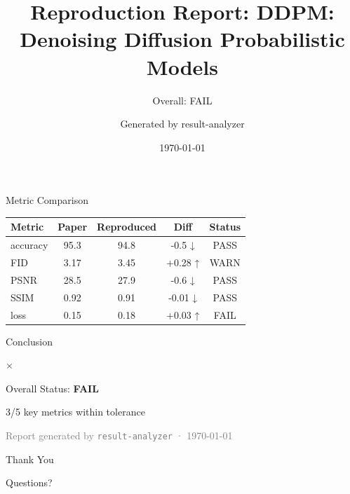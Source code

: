\documentclass[aspectratio=169,10pt]{beamer}
\newcommand{\pass}[1]{\textcolor{passcolor}{#1}}
\newcommand{\warn}[1]{\textcolor{warncolor}{#1}}
\newcommand{\fail}[1]{\textcolor{failcolor}{#1}}
\begin{document}
\title{Reproduction Report: DDPM: Denoising Diffusion Probabilistic Models}
\subtitle{\fail{Overall: FAIL}}
\author{Generated by result-analyzer}
\date{\today}

\begin{frame}
\titlepage
\end{frame}

\begin{frame}{Metric Comparison}
\vspace{4pt}
\begin{center}
\begin{tabular}{lcccc}
\toprule
\textbf{Metric} & \textbf{Paper} & \textbf{Reproduced} & \textbf{Diff} & \textbf{Status} \\
\midrule
accuracy & 95.3 & 94.8 & \pass{-0.5 ↓} & \pass{PASS} \\
FID & 3.17 & 3.45 & \warn{+0.28 ↑} & \warn{WARN} \\
PSNR & 28.5 & 27.9 & \pass{-0.6 ↓} & \pass{PASS} \\
SSIM & 0.92 & 0.91 & \pass{-0.01 ↓} & \pass{PASS} \\
loss & 0.15 & 0.18 & \warn{+0.03 ↑} & \fail{FAIL} \\
\bottomrule
\end{tabular}
\end{center}
\end{frame}

\begin{frame}{Conclusion}
\begin{center}
\vspace{1cm}

{\Huge \fail{$\times$}}

\vspace{0.5cm}

{\Large Overall Status: \fail{\textbf{FAIL}}}

\vspace{0.5cm}

{\large 3/5 key metrics within tolerance}

\vspace{1cm}

\textcolor{gray}{\small Report generated by \texttt{result-analyzer} · \today}
\end{center}
\end{frame}

\begin{frame}
\begin{center}
\vspace{2cm}
{\Huge Thank You}

\vspace{1cm}
{\large Questions?}
\end{center}
\end{frame}
\end{document}
